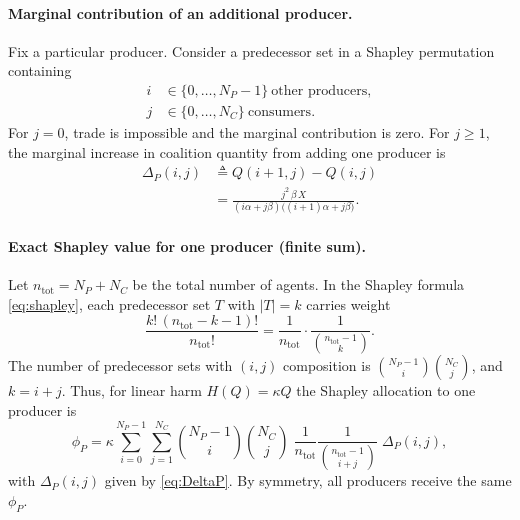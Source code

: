 \documentclass[journal, a4paper]{IEEEtran}
\begin{document}
\paragraph{Marginal contribution of an additional producer.}
Fix a particular producer. Consider a predecessor set in a Shapley permutation containing
\begin{align*}
i&\in\{0,\dots,N_P-1\}\ \text{other producers},\\
j&\in\{0,\dots,N_C\}\ \text{consumers}.
\end{align*}
For $j=0$, trade is impossible and the marginal contribution is zero. For $j\ge 1$, the marginal increase in coalition quantity from adding one producer is
\begin{align}
\Delta_P(i,j)
&\triangleq Q(i+1,j)-Q(i,j)\nonumber\\
&=\frac{j^2\,\beta\,X}{(i\alpha+j\beta)\big((i+1)\alpha+j\beta\big)}.
\label{eq:DeltaP}
\end{align}

\paragraph{Exact Shapley value for one producer (finite sum).}
Let $n_{\mathrm{tot}}=N_P+N_C$ be the total number of agents. In the Shapley formula \eqref{eq:shapley}, each predecessor set $T$ with $|T|=k$ carries weight
\begin{equation}
\frac{k!\,(n_{\mathrm{tot}}-k-1)!}{n_{\mathrm{tot}}!}
=\frac{1}{n_{\mathrm{tot}}}\cdot\frac{1}{\binom{n_{\mathrm{tot}}-1}{k}}.
\label{eq:shapley_weight_binom}
\end{equation}
The number of predecessor sets with $(i,j)$ composition is $\binom{N_P-1}{i}\binom{N_C}{j}$, and $k=i+j$. Thus, for linear harm $H(Q)=\kappa Q$ the Shapley allocation to one producer is
\begin{equation}
\phi_P
=
\kappa\sum_{i=0}^{N_P-1}\sum_{j=1}^{N_C}
\binom{N_P-1}{i}\binom{N_C}{j}\;
\frac{1}{n_{\mathrm{tot}}}\frac{1}{\binom{n_{\mathrm{tot}}-1}{i+j}}\;
\Delta_P(i,j),
\label{eq:phiP_general}
\end{equation}
with $\Delta_P(i,j)$ given by \eqref{eq:DeltaP}. By symmetry, all producers receive the same $\phi_P$.
\end{document}

